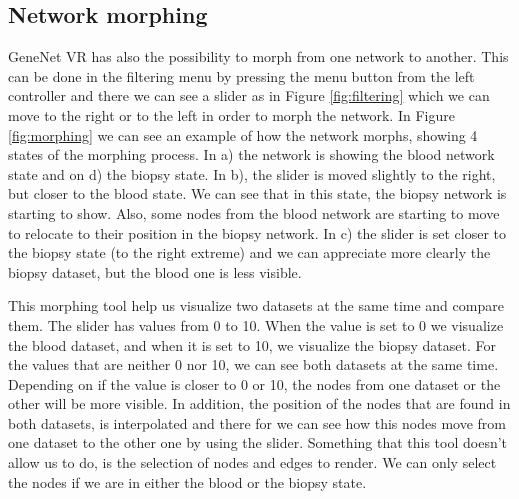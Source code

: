 \subsection{Network morphing}
GeneNet VR has also the possibility to morph from one network to another. This can be done in the filtering menu by pressing the menu button from the left controller and there we can see a slider as in Figure \ref{fig:filtering} which we can move to the right or to the left in order to morph the network. In Figure \ref{fig:morphing} we can see an example of how the network morphs, showing 4 states of the morphing process. In a) the network is showing the blood network state and on d) the biopsy state. In b), the slider is moved slightly to the right, but closer to the blood state. We can see that  in this state, the biopsy network is starting to show. Also, some nodes from the blood network are starting to move to relocate to their position in the biopsy network. In c) the slider is set closer to the biopsy state (to the right extreme) and we can appreciate more clearly the biopsy dataset, but the blood one is less visible.

This morphing tool help us visualize two datasets at the same time and compare them. The slider has values from 0 to 10. When the value is set to 0 we visualize the blood dataset, and when it is set to 10, we visualize the biopsy dataset. For the values that are neither 0 nor 10, we can see both datasets at the same time. Depending on if the value is closer to 0 or 10, the nodes from one dataset or the other will be more visible. In addition, the position of the nodes that are found in both datasets, is interpolated and there for we can see how this nodes move from one dataset to the other one by using the slider. Something that this tool doesn't allow us to do, is the selection of nodes and edges to render. We can only select the nodes if we are in either the blood or the biopsy state.

